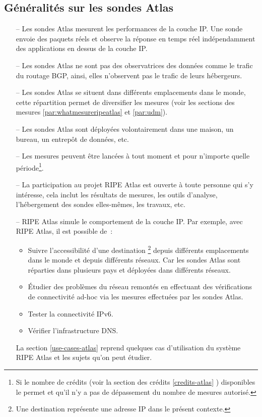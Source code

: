 \subsection{Généralités sur les sondes  Atlas}
\begin{itemize}
	\item[--] Les sondes Atlas  mesurent les performances de la couche IP. Une sonde  envoie des paquets réels et observe la réponse en temps réel indépendamment des applications en dessus de la couche IP.
	
	\item[--] Les sondes Atlas ne sont pas des observatrices des données comme le trafic du routage BGP, ainsi, elles n'observent pas  le trafic de leurs hébergeurs.
	
	\item[--] Les sondes  Atlas se situent dans différents emplacements dans le monde, cette répartition permet de diversifier les mesures (voir les sections des mesures  \ref{par:whatmesureripeatlas} et \ref{par:udm}). 
	
	\item[--] Les sondes Atlas sont déployées volontairement dans une maison, un bureau,  un entrepôt de données, etc.
	
	\item[--] Les mesures peuvent être lancées à tout moment et pour n'importe quelle période\footnote{Si le nombre de crédits (voir la section des crédits \ref{credits-atlas} ) disponibles le permet et qu'il n'y a pas de dépassement du nombre de mesures autorisé.}.
	
	\item[--] La participation au projet RIPE Atlas est ouverte à toute personne qui s'y intéresse, cela inclut  les résultats de mesures, les outils d'analyse, l'hébergement des sondes elles-mêmes, les travaux, etc.
	
	\item[--] RIPE Atlas simule le comportement de la couche IP. Par exemple, avec RIPE Atlas, il est possible  de~:
	\begin{itemize}
		\item Suivre l'accessibilité d'une destination \footnote{Une destination représente une adresse IP dans le présent contexte.} depuis différents emplacements dans le monde et  depuis différents réseaux. Car les sondes Atlas sont réparties dans plusieurs pays et déployées dans différents réseaux.
		
		\item Étudier des problèmes du réseau remontés en effectuant des vérifications de connectivité ad-hoc via les mesures effectuées par les sondes  Atlas.
		
		\item Tester la connectivité IPv6.
		
		\item Vérifier l'infrastructure DNS.
	\end{itemize}
	
	La section  \ref{use-cases-atlas} reprend quelques cas d'utilisation du système RIPE Atlas et les sujets qu'on peut étudier. 
\end{itemize}

